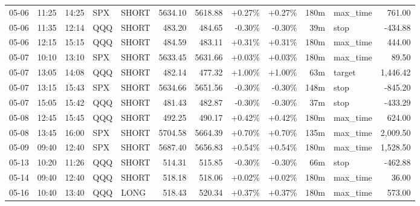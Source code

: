 \documentclass[11pt,a4paper]{article}
\begin{document}
\begin{center}
\begin{longtable}{>{\color{txtmain}}l l l l l r r r r r >{\color{txtmain}}l r}
05-06 & 11:25 & 14:25 & SPX & SHORT & 5634.10 & 5618.88 & \textcolor{wingreen}{+0.27\%} & \textcolor{wingreen}{+0.27\%} & 180m & max\_time & \textcolor{wingreen}{761.00} \\
05-06 & 11:35 & 12:14 & QQQ & SHORT & 483.20 & 484.65 & \textcolor{lossred}{-0.30\%} & \textcolor{lossred}{-0.30\%} & 39m & stop & \textcolor{lossred}{-434.88} \\
05-06 & 12:15 & 15:15 & QQQ & SHORT & 484.59 & 483.11 & \textcolor{wingreen}{+0.31\%} & \textcolor{wingreen}{+0.31\%} & 180m & max\_time & \textcolor{wingreen}{444.00} \\
05-07 & 10:10 & 13:10 & SPX & SHORT & 5633.45 & 5631.66 & \textcolor{wingreen}{+0.03\%} & \textcolor{wingreen}{+0.03\%} & 180m & max\_time & \textcolor{wingreen}{89.50} \\
05-07 & 13:05 & 14:08 & QQQ & SHORT & 482.14 & 477.32 & \textcolor{wingreen}{+1.00\%} & \textcolor{wingreen}{+1.00\%} & 63m & target & \textcolor{wingreen}{1,446.42} \\
05-07 & 13:15 & 15:43 & SPX & SHORT & 5634.66 & 5651.56 & \textcolor{lossred}{-0.30\%} & \textcolor{lossred}{-0.30\%} & 148m & stop & \textcolor{lossred}{-845.20} \\
05-07 & 15:05 & 15:42 & QQQ & SHORT & 481.43 & 482.87 & \textcolor{lossred}{-0.30\%} & \textcolor{lossred}{-0.30\%} & 37m & stop & \textcolor{lossred}{-433.29} \\
05-08 & 12:45 & 15:45 & QQQ & SHORT & 492.25 & 490.17 & \textcolor{wingreen}{+0.42\%} & \textcolor{wingreen}{+0.42\%} & 180m & max\_time & \textcolor{wingreen}{624.00} \\
05-08 & 13:45 & 16:00 & SPX & SHORT & 5704.58 & 5664.39 & \textcolor{wingreen}{+0.70\%} & \textcolor{wingreen}{+0.70\%} & 135m & max\_time & \textcolor{wingreen}{2,009.50} \\
05-09 & 09:40 & 12:40 & SPX & SHORT & 5687.40 & 5656.83 & \textcolor{wingreen}{+0.54\%} & \textcolor{wingreen}{+0.54\%} & 180m & max\_time & \textcolor{wingreen}{1,528.50} \\
05-13 & 10:20 & 11:26 & QQQ & SHORT & 514.31 & 515.85 & \textcolor{lossred}{-0.30\%} & \textcolor{lossred}{-0.30\%} & 66m & stop & \textcolor{lossred}{-462.88} \\
05-14 & 09:40 & 12:40 & QQQ & SHORT & 518.18 & 518.06 & \textcolor{wingreen}{+0.02\%} & \textcolor{wingreen}{+0.02\%} & 180m & max\_time & \textcolor{wingreen}{36.00} \\
05-16 & 10:40 & 13:40 & QQQ & LONG & 518.43 & 520.34 & \textcolor{wingreen}{+0.37\%} & \textcolor{wingreen}{+0.37\%} & 180m & max\_time & \textcolor{wingreen}{573.00} \\

\end{longtable}
\end{center}
\end{document}
